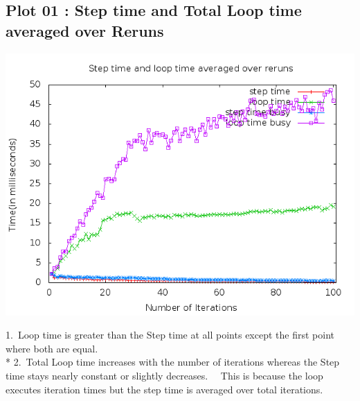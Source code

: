 \documentclass[10pt]{article}
\begin{document}
\subsection{Plot 01 : Step time and Total Loop time averaged over Reruns}
\begin{center}
\includegraphics[scale=0.4]{plot1}
\end{center}
1.\ Loop time is greater than the Step time at all points except the first point where both are equal.
\\* 2.\ Total Loop time increases with the number of iterations whereas the Step time stays nearly constant or slightly decreases. \ \ This is because the loop executes iteration times but the step time is averaged over total iterations.
\end{document}
